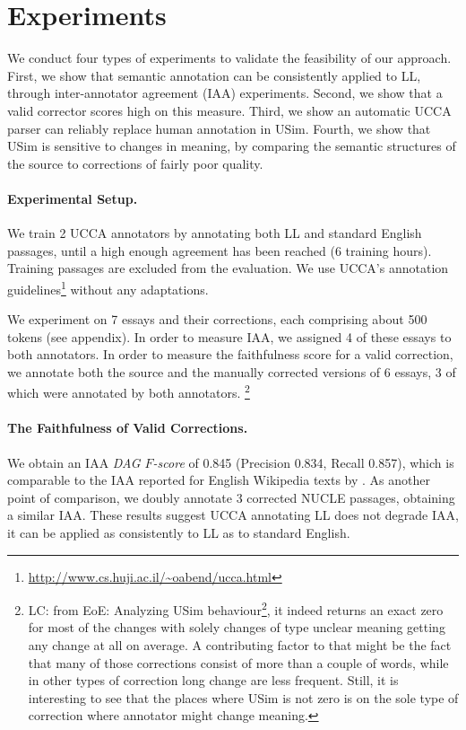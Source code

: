 \documentclass[a4paper, 11pt]{article}
\newcommand{\lc}[1]{\footnote{\color{blue}LC: #1}}
\begin{document}
\section{Experiments}
\vspace{-.2cm}


We conduct four types of experiments to validate the feasibility of our approach.
First, we show that semantic annotation can be consistently applied to 
LL, through inter-annotator agreement (IAA) experiments.
Second, we show that a valid corrector scores high on this measure.
Third, we show an automatic UCCA parser can reliably replace human annotation in {\sc USim}.
Fourth, we show that {\sc USim} is sensitive to changes in meaning, 
by comparing the semantic structures of the source to corrections of fairly poor quality.

\vspace{-.2cm}
\paragraph{Experimental Setup.}
We train 2 UCCA annotators by annotating both LL and standard English
passages, until a high enough agreement has been reached (6 training hours).
Training passages are excluded from the evaluation.
We use UCCA's annotation
guidelines\footnote{\url{http://www.cs.huji.ac.il/~oabend/ucca.html}}
without any adaptations.

We experiment on 7 essays and their corrections, each comprising about 500 tokens (see appendix).
In order to measure IAA, we assigned 4 of these essays to both annotators.
In order to measure the faithfulness score for a valid correction,
we annotate both the source
and the manually corrected versions of 6 essays,
3 of which were annotated by both annotators.
\lc{from EoE:
	Analyzing USim behaviour\lc{should be passed to the short paper?}, it indeed returns an exact zero for most of the changes with solely changes of type unclear meaning getting any change at all on average. A contributing factor to that might be the fact that many of those corrections consist of more than a couple of words, while in other types of correction long change are less frequent. Still, it is interesting to see that the places where USim is not zero is on the sole type of correction where annotator might change meaning.}
\vspace{-.2cm}
\paragraph{The Faithfulness of Valid Corrections.}
We obtain an IAA {\it DAG $F$-score} of 0.845
(Precision 0.834, Recall 0.857), which
is comparable to the IAA reported for English Wikipedia texts by \cite{abend2013universal}.
As another point of comparison, we doubly annotate 3 corrected
NUCLE \cite{dahlmeier2013building} passages, obtaining a similar IAA.
These results suggest UCCA annotating LL does not degrade IAA, 
it can be applied as consistently to LL as to standard English.
\end{document}
